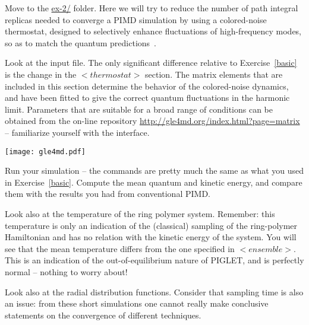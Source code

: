 \documentclass{article}
\begin{document}
\begin{Exercise}[label={piglet},title={Colored-noise thermostatting}]

Move to the \url{ex-2/} folder. Here we will try to reduce the number of 
path integral replicas needed to converge a PIMD simulation by using 
a colored-noise thermostat, designed to selectively enhance fluctuations 
of high-frequency modes, so as to match the quantum predictions~\cite{ceri-mano12prl}.

\Question 
Look at the input file. The only significant difference relative to
Exercise~\ref{basic} is the change in the \lstinxml$<thermostat>$ section. 
The matrix elements that are included in this section determine the behavior
of the colored-noise dynamics, and have been fitted to give the correct
quantum fluctuations in the harmonic limit. Parameters that are suitable for
a broad range of conditions can be obtained from the on-line repository
\url{http://gle4md.org/index.html?page=matrix} -- familiarize
yourself with the interface.

\ExeText
\texttt{[image: gle4md.pdf]}

\Question
Run your simulation -- the commands are pretty much the same as what you 
used in Exercise~\ref{basic}.  Compute the mean quantum and kinetic energy,
and compare them with the results you had from conventional PIMD. 

\Question 
Look also at the temperature of the ring polymer system. Remember: this temperature
is only an indication of the (classical) sampling of the ring-polymer Hamiltonian
and has no relation with the kinetic energy of the system. You will see that the mean
temperature differs from the one specified in \lstinxml$<ensemble>$. This is 
an indication of the out-of-equilibrium nature of PIGLET, and is perfectly normal --
nothing to worry about!

\Question Look also at the radial distribution functions. Consider that sampling 
time is also an issue: from these short simulations one cannot really 
make conclusive statements on the convergence of different techniques.

\end{Exercise}
\end{document}
